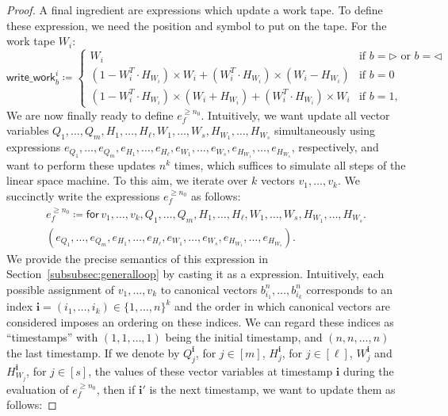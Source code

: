 \begin{proof}
    A final ingredient are expressions which update a work tape.
    To define these expression, we need the position and symbol to put on the tape. For the work tape $W_i$:
    $$
    \mathsf{write\_work}_b^i\coloneqq \begin{cases}
    W_i  & \text{if $b=\rhd$ or $b=\lhd$}\\
    (1-W_i^T\cdot H_{W_i})\times W_i + (W_i^T\cdot H_{W_i})\times (W_i-H_{W_i}) &\text{if $b=0$}\\
    (1-W_i^T\cdot H_{W_i})\times (W_i+H_{W_i}) + (W_i^T\cdot H_{W_i})\times W_i &\text{if $b=1$},
    \end{cases}
    $$
    We are now finally ready to define $e_f^{\geq n_0}$. Intuitively, we want update all vector variables
	$Q_1,\ldots,\allowbreak Q_m,\allowbreak H_1,\ldots,H_\ell,W_1,\ldots,W_s, H_{W_1},\ldots,H_{W_s}$
	simultaneously using expressions $e_{Q_1},\ldots,e_{Q_m},\allowbreak e_{H_1},\allowbreak\ldots,\allowbreak e_{H_\ell},\allowbreak e_{W_1},\ldots,e_{W_s},e_{H_{W_1}},\ldots,e_{H_{W_s}}$, respectively, and want to perform these updates $n^k$ times,
	which suffices to simulate all steps of the linear space machine. To this aim, we iterate over $k$ vectors $v_1,\ldots, v_k$.
	We succinctly write the expressions  $e_f^{\geq n_0}$ as follows:
    \begin{multline*}
    e_f^{\geq n_0}\coloneqq  \mathsf{for\,} v_1,\ldots,v_{k},Q_1,\ldots,Q_m,H_1,\ldots,H_\ell,W_1,\ldots,W_s, H_{W_1},\ldots,H_{W_s}. \\
    (e_{Q_1},\ldots,e_{Q_m},e_{H_1},\ldots,e_{H_\ell},e_{W_1},\ldots,e_{W_s},e_{H_{W_1}},\ldots,e_{H_{W_s}}).
    \end{multline*}
	We provide the precise semantics of this expression in Section~\ref{subsubsec:generalloop} by casting it as a \langfor expression.
	Intuitively, each possible assignment of $v_1,\ldots,v_k$ to canonical vectors $b_{i_1}^n,\ldots, b_{i_k}^n$ corresponds to an index $\mathbf{i}=(i_1,\ldots,i_k)\in\{1,\ldots,n\}^k$
	and the order in which canonical vectors are considered imposes an ordering on these indices. We can regard these indices as ``timestamps''
	with $(1,1,\ldots,1)$ being the initial timestamp, and $(n,n,\ldots,n)$ the last timestamp.
		If we denote by $Q_j^{\mathbf{i}}$, for $j\in[m]$, $H_j^{\mathbf{i}}$, for $j\in[\ell]$, $W_j^{\mathbf{i}}$ and $H_{W_j}^{\mathbf{i}}$, for $j\in[s]$, the values of these vector variables at timestamp $\mathbf{i}$ during the evaluation of $e_f^{\geq n_0}$, then if $\mathbf{i}'$ is the next timestamp, we want to update them as follows:

\end{proof}
